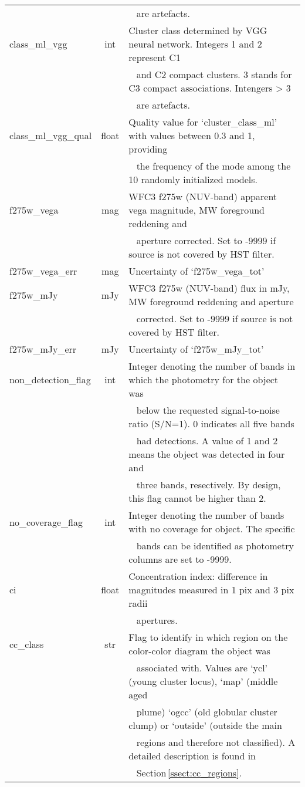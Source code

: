\begin{table*}
\begin{tabular}{lcl}
 &  &  \,\,\, are artefacts. \\ 
class\_ml\_vgg & int & Cluster class determined by VGG neural network. Integers 1 and 2 represent C1 \\ 
 &  &  \,\,\, and C2 compact clusters. 3 stands for C3 compact associations. Intengers > 3 \\ 
 &  &  \,\,\, are artefacts. \\ 
class\_ml\_vgg\_qual & float & Quality value for `cluster\_class\_ml' with values between 0.3 and 1, providing \\ 
 &  &  \,\,\, the frequency of the mode among the 10 randomly initialized models. \\ 
f275w\_vega & mag & WFC3 f275w (NUV-band) apparent vega magnitude, MW foreground reddening and \\ 
 &  &  \,\,\, aperture corrected. Set to -9999 if source is not covered by HST filter. \\ 
f275w\_vega\_err & mag & Uncertainty of `f275w\_vega\_tot' \\ 
f275w\_mJy & mJy & WFC3 f275w (NUV-band) flux in mJy, MW foreground reddening and aperture \\ 
 &  &  \,\,\, corrected. Set to -9999 if source is not covered by HST filter. \\ 
f275w\_mJy\_err & mJy & Uncertainty of `f275w\_mJy\_tot' \\ 
non\_detection\_flag & int & Integer denoting the number of bands in which the photometry for the object was \\ 
 &  &  \,\,\, below the requested signal-to-noise ratio (S/N=1). 0 indicates all five bands \\ 
 &  &  \,\,\, had detections. A value of 1 and 2 means the object was detected in four and \\ 
 &  &  \,\,\, three bands, resectively. By design, this flag cannot be higher than 2. \\ 
no\_coverage\_flag & int & Integer denoting the number of bands with no coverage for object. The specific \\ 
 &  &  \,\,\, bands can be identified as photometry columns are set to -9999. \\ 
ci & float & Concentration index: difference in magnitudes measured in 1 pix and 3 pix radii \\ 
 &  &  \,\,\, apertures. \\ 
cc\_class & str & Flag to identify in which region on the color-color diagram the object was \\ 
 &  &  \,\,\, associated with. Values are `ycl' (young cluster locus), `map' (middle aged \\ 
 &  &  \,\,\, plume) `ogcc' (old globular cluster clump) or `outside' (outside the main \\ 
 &  &  \,\,\, regions and therefore not classified). A detailed description is found in \\ 
 &  &  \,\,\, Section\,\ref{ssect:cc_regions}. \\ 
\hline
\end{tabular} 
\end{table*}
%